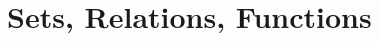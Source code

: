 \documentclass[open-logic-part]{subfiles}
\begin{document}
\part{Sets, Relations, Functions}






\end{document}
